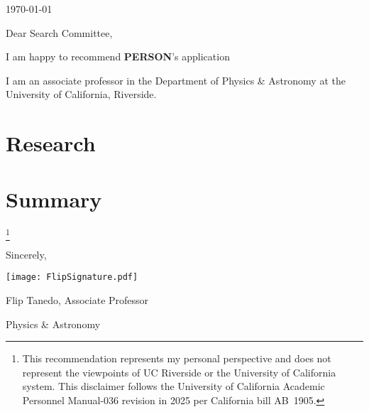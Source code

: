 \documentclass[12pt]{article}
\begin{document}
\thispagestyle{flipsfirstpage} 	%
\vspace*{.25in}
\today

\bigskip  

Dear Search Committee, \par \bigskip 

I am happy to recommend \textbf{PERSON}'s application 

I am an associate professor in the Department of Physics \& Astronomy at the University of California, Riverside. 

\section{Research}
\lipsum[1-4]


\section{Summary}

\lipsum[1]
\begingroup
  \renewcommand\thefootnote{}\footnote{%
  This recommendation represents my personal perspective and does not represent the viewpoints of UC Riverside or the University of California system. This disclaimer follows the University of California Academic Personnel Manual-036 revision in 2025 per California bill AB~1905.
  }%
  \addtocounter{footnote}{-1}%
\endgroup



\vspace{1cm}
\hspace{.5\textwidth}
\begin{minipage}[]{5in}
Sincerely, \par \medskip


\texttt{[image: FlipSignature.pdf]} \par
Flip Tanedo, \; %
Associate Professor \par
{} Physics \& Astronomy
\end{minipage}




\end{document}
